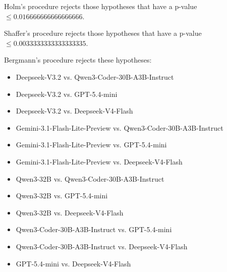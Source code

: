 \documentclass[a4paper,10pt]{article}
\begin{document}
\begin{landscape}
Holm's procedure rejects those hypotheses that have a p-value $\le0.016666666666666666$.


Shaffer's procedure rejects those hypotheses that have a p-value $\le0.0033333333333333335$.


Bergmann's procedure rejects these hypotheses:


\begin{itemize}


\item Deepseek-V3.2 vs. Qwen3-Coder-30B-A3B-Instruct\item Deepseek-V3.2 vs. GPT-5.4-mini\item Deepseek-V3.2 vs. Deepseek-V4-Flash\item Gemini-3.1-Flash-Lite-Preview vs. Qwen3-Coder-30B-A3B-Instruct\item Gemini-3.1-Flash-Lite-Preview vs. GPT-5.4-mini\item Gemini-3.1-Flash-Lite-Preview vs. Deepseek-V4-Flash\item Qwen3-32B vs. Qwen3-Coder-30B-A3B-Instruct\item Qwen3-32B vs. GPT-5.4-mini\item Qwen3-32B vs. Deepseek-V4-Flash\item Qwen3-Coder-30B-A3B-Instruct vs. GPT-5.4-mini\item Qwen3-Coder-30B-A3B-Instruct vs. Deepseek-V4-Flash\item GPT-5.4-mini vs. Deepseek-V4-Flash\end{itemize}



\end{landscape}
\end{document}
